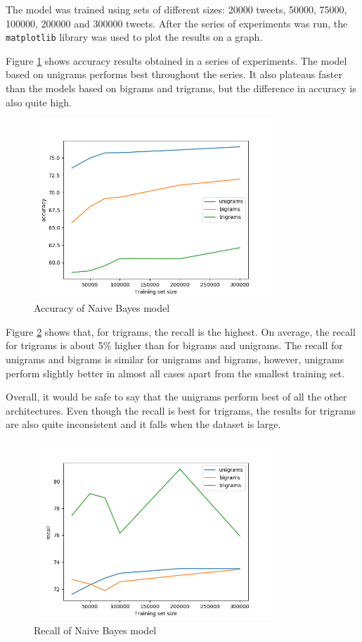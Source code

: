 The model was trained using sets of different sizes: 20000 tweets, 50000, 75000, 100000, 200000 and 300000 tweets.  After the series of experiments was run, the \texttt{matplotlib} library was used to plot the results on a graph.

Figure \ref{fig:nbacc} shows accuracy results obtained in a series of experiments. The model based on unigrams performs best throughout the series. It also plateaus faster than the models based on bigrams and trigrams, but the difference in accuracy is also quite high. 

\begin{figure}[ht]
    \centering
    \includegraphics[width=0.8\textwidth]{NaiveBayesacc}
    \caption{Accuracy of Naive Bayes model}
    \label{fig:nbacc}
\end{figure}

Figure \ref{fig:nbrec} shows that, for trigrams, the recall is the highest. On average, the recall for trigrams is about 5\% higher than for bigrams and unigrams. The recall for unigrams and bigrams is similar for unigrams and bigrams, however, unigrams perform slightly better in almost all cases apart from the smallest training set.

Overall, it would be safe to say that the unigrams perform best of all the other architectures. Even though the recall is best for trigrams, the results for trigrams are also quite inconsistent and it falls when the dataset is large.

\begin{figure}[ht]
    \centering
    \includegraphics[width=0.8\textwidth]{NaiveBayesrec}
    \caption{Recall of Naive Bayes model}
    \label{fig:nbrec}
\end{figure}

